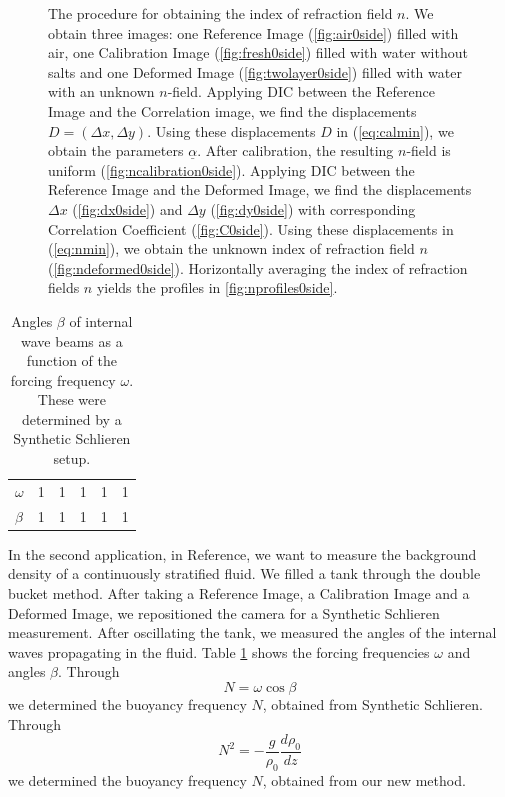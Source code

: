 \documentclass{article}
\begin{document}
\begin{figure}[htbp]
\caption{The procedure for obtaining the index of refraction field $n$. We obtain three images: one Reference Image (\ref{fig:air0side}) filled with air, one Calibration Image (\ref{fig:fresh0side}) filled with water without salts and one Deformed Image (\ref{fig:twolayer0side}) filled with water with an unknown $n$-field. Applying DIC between the Reference Image and the Correlation image, we find the displacements $D=(\Delta x, \Delta y)$. Using these displacements $D$ in (\ref{eq:calmin}), we obtain the parameters $\underline{\alpha}$. After calibration, the resulting $n$-field is uniform (\ref{fig:ncalibration0side}). Applying DIC between the Reference Image and the Deformed Image, we find the displacements $\Delta x$ (\ref{fig:dx0side}) and $\Delta y$ (\ref{fig:dy0side}) with corresponding Correlation Coefficient (\ref{fig:C0side}).  Using these displacements in (\ref{eq:nmin}), we obtain the unknown index of refraction field $n$ (\ref{fig:ndeformed0side}). Horizontally averaging the index of refraction fields $n$ yields the profiles in \ref{fig:nprofiles0side}.}
\label{fig:0side}
\end{figure}

\begin{table}[htbp]
\caption{Angles $\beta$ of internal wave beams as a function of the forcing frequency $\omega$. These were determined by a Synthetic Schlieren setup.}
\label{tab:SSintwav}
\centering
\begin{tabular}{llllll}
$\omega$ & 1 & 1 & 1 & 1 & 1  \\
$\beta$  & 1 & 1 & 1 & 1 & 1
\end{tabular}
\end{table}

In the second application, in Reference, we want to measure the background density of a continuously stratified fluid. We filled a tank through the double bucket method. After taking a Reference Image, a Calibration Image and a Deformed Image, we repositioned the camera for a Synthetic Schlieren measurement. After oscillating the tank, we measured the angles of the internal waves propagating in the fluid. Table \ref{tab:SSintwav} shows the forcing frequencies $\omega$ and angles $\beta$. Through
\begin{equation}
	N = \omega \cos \beta
\end{equation}
we determined the buoyancy frequency $N$, obtained from Synthetic Schlieren. Through
\begin{equation}
	N^2 = - \frac{g}{\rho_0}\frac{d \rho_0}{d z}
\end{equation}
we determined the buoyancy frequency $N$, obtained from our new method. 
\end{document}
